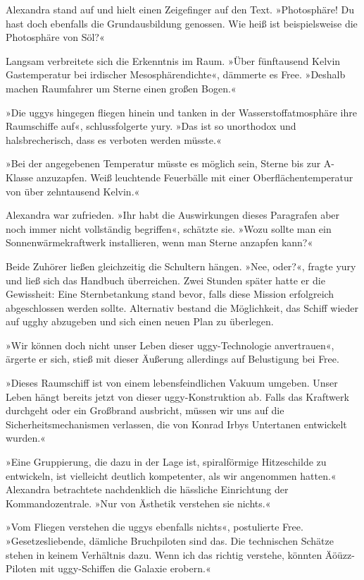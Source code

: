 Alexandra stand auf und hielt einen Zeigefinger auf den Text. »Photosphäre! Du hast doch ebenfalls die Grundausbildung genossen. Wie heiß ist beispielsweise die Photosphäre von Söl?«

Langsam verbreitete sich die Erkenntnis im Raum. »Über fünftausend Kelvin Gastemperatur bei irdischer Mesosphärendichte«, dämmerte es Free. »Deshalb machen Raumfahrer um Sterne einen großen Bogen.«

»Die uggys hingegen fliegen hinein und tanken in der Wasserstoffatmosphäre ihre Raumschiffe auf«, schlussfolgerte yury. »Das ist so unorthodox und halsbrecherisch, dass es verboten werden müsste.«

»Bei der angegebenen Temperatur müsste es möglich sein, Sterne bis zur A-Klasse anzuzapfen. Weiß leuchtende Feuerbälle mit einer Oberflächentemperatur von über zehntausend Kelvin.«

Alexandra war zufrieden. »Ihr habt die Auswirkungen dieses Paragrafen aber noch immer nicht vollständig begriffen«, schätzte sie. »Wozu sollte man ein Sonnenwärmekraftwerk installieren, wenn man Sterne anzapfen kann?«

Beide Zuhörer ließen gleichzeitig die Schultern hängen. »Nee, oder?«, fragte yury und ließ sich das Handbuch überreichen. Zwei Stunden später hatte er die Gewissheit: Eine Sternbetankung stand bevor, falls diese Mission erfolgreich abgeschlossen werden sollte. Alternativ bestand die Möglichkeit, das Schiff wieder auf ugghy abzugeben und sich einen neuen Plan zu überlegen.

»Wir können doch nicht unser Leben dieser uggy-Technologie anvertrauen«, ärgerte er sich, stieß mit dieser Äußerung allerdings auf Belustigung bei Free.

»Dieses Raumschiff ist von einem lebensfeindlichen Vakuum umgeben. Unser Leben hängt bereits jetzt von dieser uggy-Konstruktion ab. Falls das Kraftwerk durchgeht oder ein Großbrand ausbricht, müssen wir uns auf die Sicherheitsmechanismen verlassen, die von Konrad Irbys Untertanen entwickelt wurden.«

»Eine Gruppierung, die dazu in der Lage ist, spiralförmige Hitzeschilde zu entwickeln, ist vielleicht deutlich kompetenter, als wir angenommen hatten.« Alexandra betrachtete nachdenklich die hässliche Einrichtung der Kommandozentrale. »Nur von Ästhetik verstehen sie nichts.«

»Vom Fliegen verstehen die uggys ebenfalls nichts«, postulierte Free. »Gesetzesliebende, dämliche Bruchpiloten sind das. Die technischen Schätze stehen in keinem Verhältnis dazu. Wenn ich das richtig verstehe, könnten Äöüzz-Piloten mit uggy-Schiffen die Galaxie erobern.«

